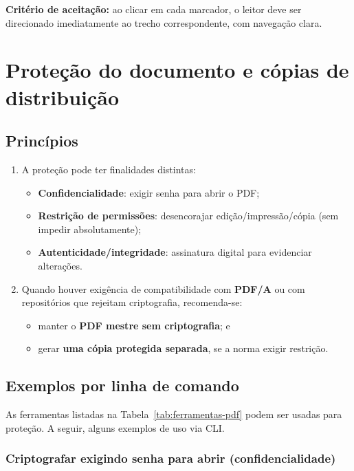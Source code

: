 \noindent\textbf{Critério de aceitação:} ao clicar em cada marcador, o leitor deve ser direcionado imediatamente ao trecho correspondente, com navegação clara.

\section{Proteção do documento e cópias de distribuição}\label{sec:cap6-protecao}

\subsection{Princípios}

\begin{enumerate}
    \item A proteção pode ter finalidades distintas:
    \begin{itemize}
        \item \textbf{Confidencialidade}: exigir senha para abrir o PDF;
        \item \textbf{Restrição de permissões}: desencorajar edição/impressão/cópia (sem impedir absolutamente);
        \item \textbf{Autenticidade/integridade}: assinatura digital para evidenciar alterações.
    \end{itemize}

    \item Quando houver exigência de compatibilidade com \textbf{PDF/A} ou com repositórios que rejeitam criptografia, recomenda-se:
    \begin{itemize}
        \item manter o \textbf{PDF mestre sem criptografia}; e
        \item gerar \textbf{uma cópia protegida separada}, se a norma exigir restrição.
    \end{itemize}
\end{enumerate}

\subsection{Exemplos por linha de comando}

As ferramentas listadas na Tabela~\ref{tab:ferramentas-pdf} podem ser usadas para proteção. A seguir, alguns exemplos de uso via \ac{CLI}.

\subsubsection*{Criptografar exigindo senha para abrir (confidencialidade)}


